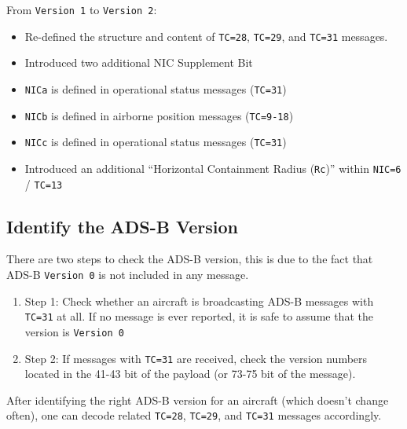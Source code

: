 From \texttt{Version\ 1} to \texttt{Version\ 2}:

\begin{itemize}
\item
  Re-defined the structure and content of \texttt{TC=28},
  \texttt{TC=29}, and \texttt{TC=31} messages.
\item
  Introduced two additional NIC Supplement Bit
\item
  \texttt{NICa} is defined in operational status messages
  (\texttt{TC=31})
\item
  \texttt{NICb} is defined in airborne position messages
  (\texttt{TC=9-18})
\item
  \texttt{NICc} is defined in operational status messages
  (\texttt{TC=31})
\item
  Introduced an additional ``Horizontal Containment Radius
  (\texttt{Rc})'' within \texttt{NIC=6} / \texttt{TC=13}
\end{itemize}

\subsection{Identify the ADS-B
Version}\label{identify-the-ads-b-version}

There are two steps to check the ADS-B version, this is due to the fact
that ADS-B \texttt{Version\ 0} is not included in any message.

\begin{enumerate}
\def\labelenumi{\arabic{enumi}.}
\item
  Step 1: Check whether an aircraft is broadcasting ADS-B messages with
  \texttt{TC=31} at all. If no message is ever reported, it is safe to
  assume that the version is \texttt{Version\ 0}
\item
  Step 2: If messages with \texttt{TC=31} are received, check the
  version numbers located in the 41-43 bit of the payload (or 73-75 bit
  of the message).
\end{enumerate}

After identifying the right ADS-B version for an aircraft (which doesn't
change often), one can decode related \texttt{TC=28}, \texttt{TC=29},
and \texttt{TC=31} messages accordingly.
